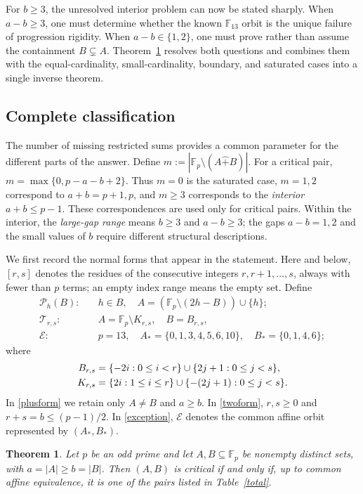 \documentclass[12pt]{article}
\newtheorem{theorem}{Theorem}[section]
\theoremstyle{remark}
\newcommand{\F}{\mathbb{F}_p}
\newcommand{\rs}{\mathbin{\widehat+}}
\begin{document}
For $b\ge3$, the unresolved interior problem can now be stated sharply.
When $a-b\ge3$, one must determine whether the known $\mathbb F_{13}$
orbit is the unique failure of progression rigidity.  When
$a-b\in\{1,2\}$, one must prove rather than assume the containment
$B\subsetneq A$.  Theorem~\ref{main} resolves both questions and combines
them with the equal-cardinality, small-cardinality, boundary, and
saturated cases into a single inverse theorem.

\subsection{Complete classification}

The number of missing restricted sums provides a common parameter for
the different parts of the answer.  Define $m:=|\F\setminus(A\rs B)|$.
For a critical pair, $m=\max\{0,p-a-b+2\}$.  Thus $m=0$ is the saturated case, $m=1,2$ correspond to $a+b=p+1,p$,
and $m\ge3$ corresponds to the \emph{interior} $a+b\le p-1$.
These correspondences are used only for critical pairs.  Within the
interior, the \emph{large-gap range} means $b\ge3$ and $a-b\ge3$;
the gaps $a-b=1,2$ and the small values of $b$ require different
structural descriptions.

We first record the normal forms that appear in the statement.  Here and
below, $[r,s]$ denotes the residues of the consecutive integers
$r,r+1,\ldots,s$, always with fewer than $p$ terms; an empty index range
means the empty set.  Define
\begin{align}
\mathcal P_h(B):\quad &h\in B,\quad
 A=(\F\setminus(2h-B))\cup\{h\};\label{plusform}\\
 \mathcal T_{r,s}:\quad&A=\F\setminus K_{r,s},\quad B=B_{r,s},\label{twoform}\\
 \mathcal E:\quad&p=13,\quad A_* =\{0,1,3,4,5,6,10\},\quad
 B_* =\{0,1,4,6\};\label{exception}
\end{align}
where
\begin{align}
B_{r,s}&=\{-2i:0\le i<r\}\cup\{2j+1:0\le j<s\},\notag \\
K_{r,s}&=\{2i:1\le i\le r\}\cup\{-(2j+1):0\le j<s\}.\notag
\end{align}
In \eqref{plusform} we retain only $A\ne B$ and $a\ge b$.  In
\eqref{twoform}, $r,s\ge0$ and $r+s=b\le(p-1)/2$.  In
\eqref{exception}, $\mathcal E$ denotes the common affine orbit
represented by $(A_*,B_*)$.

\begin{theorem}\label{main}
Let $p$ be an odd prime and let $A,B\subseteq\F$ be nonempty distinct
sets, with $a=|A|\ge b=|B|$. Then $(A,B)$ is critical if and only if,
up to common affine equivalence, it is one of the pairs listed in
Table~\ref{total}.
\end{theorem}
\end{document}
